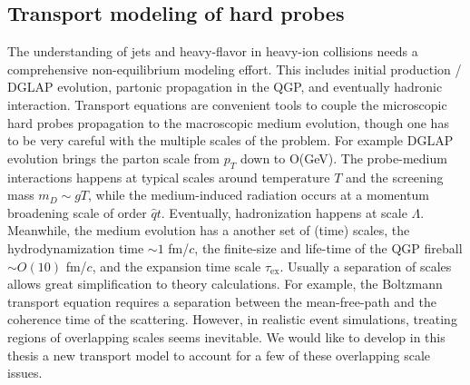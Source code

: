 \subsection{Transport modeling of hard probes}
The understanding of jets and heavy-flavor in heavy-ion collisions needs a comprehensive non-equilibrium modeling effort.
This includes initial production / DGLAP evolution, partonic propagation in the QGP, and eventually hadronic interaction.
Transport equations are convenient tools to couple the microscopic hard probes propagation to the macroscopic medium evolution, though one has to be very careful with the multiple scales of the problem.
For example DGLAP evolution brings the parton scale from $p_T$ down to O(GeV).
The probe-medium interactions happens at typical scales around temperature $T$ and the screening mass $m_D \sim gT$, while the medium-induced radiation occurs at a momentum broadening scale of order $\hat{q} t$.
Eventually, hadronization happens at scale $\Lambda$.
Meanwhile, the medium evolution has a another set of (time) scales, the hydrodynamization time $\sim 1$ fm/$c$, the finite-size and life-time of the QGP fireball $\sim O(10)$  fm/$c$, and the expansion time scale $\tau_{\textrm{ex}}$.
Usually a separation of scales allows great simplification to theory calculations.
For example, the Boltzmann transport equation requires a separation between the mean-free-path and the coherence time of the scattering.
However, in realistic event simulations, treating regions of overlapping scales seems inevitable.
We would like to develop in this thesis a new transport model to account for a few of these overlapping scale issues.


